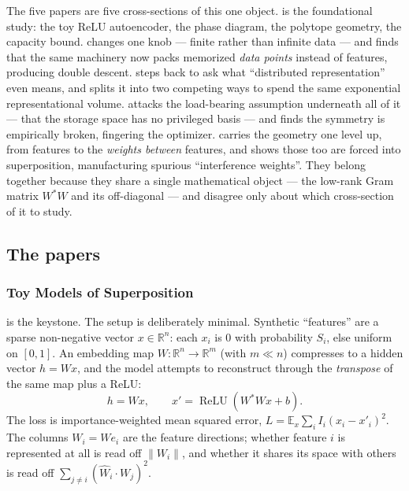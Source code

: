 The five papers are five cross-sections of this one object. \textcite{toy-models-superposition} is the foundational study: the toy ReLU autoencoder, the phase diagram, the polytope geometry, the capacity bound. \textcite{superposition-memorization-double-descent} changes one knob --- finite rather than infinite data --- and finds that the same machinery now packs memorized \emph{data points} instead of features, producing double descent. \textcite{distributed-representations-composition-superposition} steps back to ask what ``distributed representation'' even means, and splits it into two competing ways to spend the same exponential representational volume. \textcite{privileged-bases-residual-stream} attacks the load-bearing assumption underneath all of it --- that the storage space has no privileged basis --- and finds the symmetry is empirically broken, fingering the optimizer. \textcite{toy-model-of-interference-weights} carries the geometry one level up, from features to the \emph{weights between} features, and shows those too are forced into superposition, manufacturing spurious ``interference weights''. They belong together because they share a single mathematical object --- the low-rank Gram matrix $W^{*}W$ and its off-diagonal --- and disagree only about which cross-section of it to study.


\subsection*{The papers}

\subsubsection*{Toy Models of Superposition}

\textcite{toy-models-superposition} is the keystone. The setup is deliberately minimal. Synthetic ``features'' are a sparse non-negative vector $x \in \mathbb{R}^n$: each $x_i$ is $0$ with probability $S_i$, else uniform on $[0,1]$. An embedding map $W:\mathbb{R}^n \to \mathbb{R}^m$ (with $m \ll n$) compresses to a hidden vector $h = Wx$, and the model attempts to reconstruct through the \emph{transpose} of the same map plus a ReLU:
\[
  h = Wx, \qquad x' = \operatorname{ReLU}(W^{*}W x + b).
\]
The loss is importance-weighted mean squared error, $L = \mathbb{E}_x \sum_i I_i (x_i - x'_i)^2$. The columns $W_i = W e_i$ are the feature directions; whether feature $i$ is represented at all is read off $\lVert W_i\rVert$, and whether it shares its space with others is read off $\sum_{j\ne i}(\hat W_i \cdot W_j)^2$.


